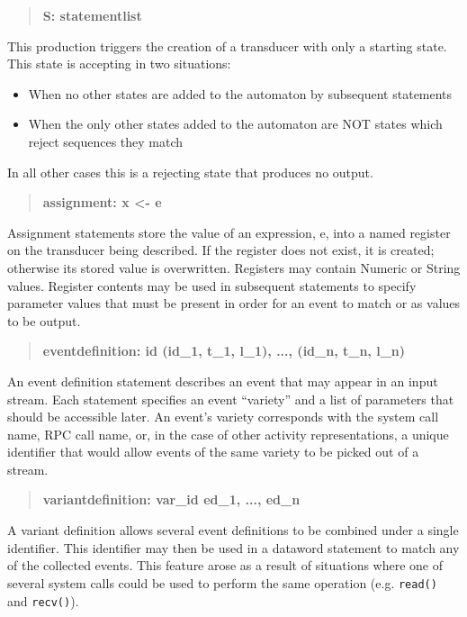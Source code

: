 \begin{quote}
\centering
\textbf{S: statementlist}
\end{quote}

This production triggers the creation of a transducer with only a starting
state.  This state is accepting in two situations:
\begin{itemize}
  \item{When no other states are added to the automaton by subsequent
    statements}
  \item{When the only other states added to the automaton are NOT states
    which reject sequences they match}
\end{itemize}
In all other cases this is a rejecting state that produces no output.

\begin{quote}
\centering
\textbf{assignment: x <- e}
\end{quote}

Assignment statements store the value of an expression, e, into a named
register on the transducer being described.
If the register does not exist,
it is created;
otherwise its stored value is overwritten.
Registers may contain Numeric or String values.  Register contents
may be used in subsequent statements to specify parameter values that must
be present in order for an event to match or as values to be output.

\begin{quote}
\centering
\textbf{eventdefinition: id (id\_1, t\_1, l\_1), ..., (id\_n, t\_n, l\_n) }
\end{quote}


An event definition statement describes an event that may appear in an input
stream.  Each statement specifies an event ``variety'' and a list of
parameters that should be accessible later.  An event's variety corresponds
with the system call name, RPC call name, or, in the case of other activity
representations, a unique identifier that would allow events of the same
variety to be picked out of a stream.

\begin{quote}
\centering
\textbf{variantdefinition: var\_id ed\_1, ..., ed\_n}
\end{quote}

A variant definition allows several event definitions to be combined under
a single identifier.  This identifier may then be used in a dataword
statement to match any of the collected events.  This feature arose as a
result of situations where one of several system calls could be used to
perform the same operation (e.g. {\tt read()} and {\tt recv()}).

